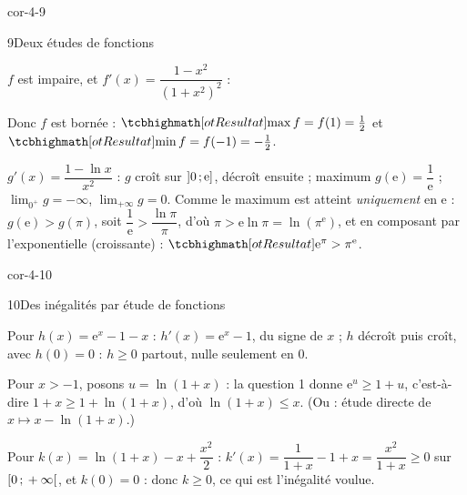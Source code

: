 \begin{blocLivre}{cor-4-9}
\begin{corrige}{9}{Deux études de fonctions}
\begin{questions}
  \item $f$ est impaire, et $f'(x)=\dfrac{1-x^{2}}{(1+x^{2})^{2}}$ :
\begin{center}
\begin{tableau}
\end{tableau}
\end{center}
    Donc $f$ est bornée : $\res{\max f=f(1)=\tfrac12}$ et
    $\res{\min f=f(-1)=-\tfrac12}$.
  \item $g'(x)=\dfrac{1-\ln x}{x^{2}}$ : $g$ croît sur $\mathopen{]}0\,{;}\,\mathrm{e}\mathclose{]}$,
    décroît ensuite ; maximum $g(\mathrm{e})=\dfrac{1}{\mathrm{e}}$ ;
    $\lim_{0^{+}}g=-\infty$, $\lim_{+\infty}g=0$. Comme le maximum est
    atteint \emph{uniquement} en $\mathrm{e}$ : $g(\mathrm{e})>g(\pi)$, soit
    $\dfrac{1}{\mathrm{e}}>\dfrac{\ln\pi}{\pi}$, d'où $\pi>\mathrm{e}\ln\pi=\ln(\pi^{\mathrm{e}})$,
    et en composant par l'exponentielle (croissante) :
    $\res{\mathrm{e}^{\pi}>\pi^{\mathrm{e}}}$.
\end{questions}
\end{corrige}
\end{blocLivre}

\begin{blocLivre}{cor-4-10}
\begin{corrige}{10}{Des inégalités par étude de fonctions}
\begin{questions}
  \item Pour $h(x)=\mathrm{e}^{x}-1-x$ : $h'(x)=\mathrm{e}^{x}-1$, du signe de $x$ ;
    $h$ décroît puis croît, avec $h(0)=0$ : $h\geq0$ partout, nulle
    seulement en $0$.
  \item Pour $x>-1$, posons $u=\ln(1+x)$ : la question 1 donne
    $\mathrm{e}^{u}\geq1+u$, c'est-à-dire $1+x\geq1+\ln(1+x)$, d'où
    $\ln(1+x)\leq x$. (Ou : étude directe de $x\mapsto x-\ln(1+x)$.)
  \item Pour $k(x)=\ln(1+x)-x+\dfrac{x^{2}}{2}$ :
    $k'(x)=\dfrac{1}{1+x}-1+x=\dfrac{x^{2}}{1+x}\geq0$ sur $\mathopen{[}0\,{;}\,+\infty\mathclose{[}$,
    et $k(0)=0$ : donc $k\geq0$, ce qui est l'inégalité voulue.
\end{questions}
\end{corrige}
\end{blocLivre}

